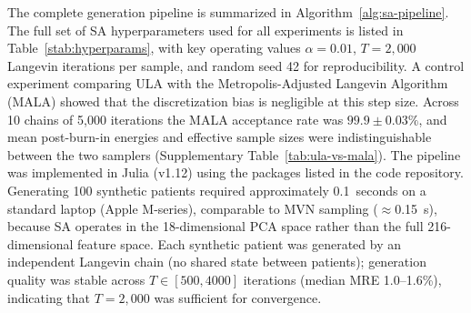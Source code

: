 The complete generation pipeline is summarized in Algorithm~\ref{alg:sa-pipeline}.
The full set of SA hyperparameters used for all experiments is listed in
Table~\ref{stab:hyperparams}, with key operating values $\alpha = 0.01$,
$T = 2{,}000$ Langevin iterations per sample, and random seed 42 for
reproducibility. A control experiment comparing ULA with the
Metropolis-Adjusted Langevin Algorithm (MALA) showed that the
discretization bias is negligible at this step size. Across 10 chains of
5{,}000 iterations the MALA acceptance rate was $99.9 \pm 0.03\%$, and mean
post-burn-in energies and effective sample sizes were indistinguishable
between the two samplers (Supplementary Table~\ref{tab:ula-vs-mala}). The pipeline was implemented in Julia (v1.12) using the packages listed in the code
repository. Generating 100 synthetic patients required approximately 0.1~seconds on
a standard laptop (Apple M-series), comparable to MVN sampling ($\approx$0.15~s),
because SA operates in the 18-dimensional PCA space rather than the full
216-dimensional feature space. Each synthetic patient was generated by an independent
Langevin chain (no shared state between patients); generation quality was stable
across $T \in [500, 4000]$ iterations (median MRE 1.0--1.6\%), indicating that
$T{=}2{,}000$ was sufficient for convergence.

